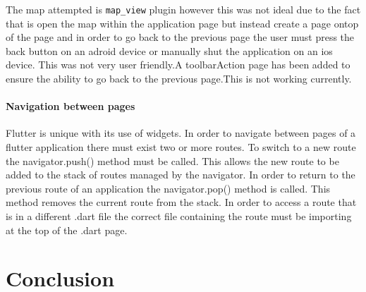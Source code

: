The map attempted is \texttt{map\_view} plugin however this was not ideal due to the fact that is open the map within the application page but instead create a page ontop of the page and in order to go back to the previous page the user must press the back button on an adroid device or manually shut the application on an ios device. This was not very user friendly.A toolbarAction page has been added to ensure the ability to go back to the previous page.This is not working currently.

\subsubsection{Navigation between pages}
Flutter is unique with its use of widgets. In order to navigate between pages of a flutter application there must exist two or more routes. To switch to a new route the navigator.push() method must be called. This allows the new route to be added to the stack of routes managed by the navigator. In order to return to the previous route of an application the navigator.pop() method is called. This method removes the current route from the stack. In order to access a route that is in a different .dart file the correct file containing the route must be importing at the top of the .dart page.


\chapter{Conclusion}

 






 


